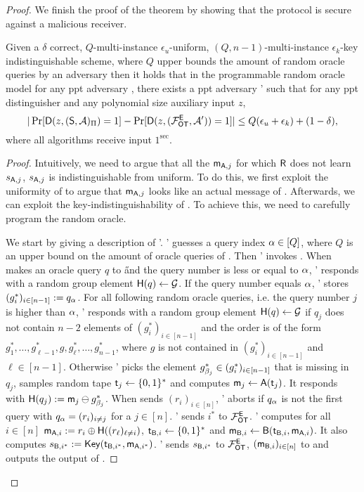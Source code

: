 \begin{proof}
We finish the proof of the theorem by showing that the \OT protocol is secure against a malicious receiver.
\begin{claim}\label{claim:malreceiver}
Given a $\delta$ correct,  $Q$-multi-instance $\epsilon_u$-uniform,  $(Q,n-1)$-multi-instance $\epsilon_k$-key indistinguishable  \UKA scheme, where $Q$ upper bounds the amount of random oracle queries by an adversary then it holds that in the programmable random oracle model for any ppt adversary \Adv, there exists a ppt adversary \Adv' such that for any ppt distinguisher \D and any polynomial size auxiliary input $z$,
$$
|\Pr[\mathsf D(z,(\mathsf{S}, \mathcal{A})_{\Pi})=1] -\Pr[\mathsf D(z,(\mathcal{F}_{\mathsf{OT}}^\mathsf{E},\mathcal{A}'))=1]|\leq Q(\epsilon_{u}+\epsilon_{k})+(1-\delta),
$$
where all algorithms receive input $1^\sec$.
\end{claim}


\begin{proof}
Intuitively, we need to argue that all the $\mathsf{m}_{\mathsf{A},j}$ for which $\mathsf{R}$ does not learn $s_{\mathsf{A},j}$,  $s_{\mathsf{A},j}$ is indistinguishable from uniform. To do this, we first exploit the uniformity of \UKA to argue that $\mathsf{m}_{\mathsf{A},j}$ looks like an actual message of \UKA. Afterwards, we can exploit the key-indistinguishability of \UKA. To achieve this, we need to carefully program the random oracle.

We start by giving a description of \Adv'. \Adv' guesses a query index $\alpha\in[Q]$, where $Q$ is an upper bound on the amount of oracle queries of \Adv. Then \Adv'  invokes \Adv.
When \Adv makes an oracle query $q$ to \H and the query number is less or equal to $\alpha$, \Adv' responds with a random group element $\mathsf{H}(q)\leftarrow\mathcal{G}$. 
If the query number equals $\alpha$, \Adv' stores $(g^*_i)_{i\in[n-1]}:=q_{\alpha}$. 
For all following random oracle queries, i.e. the query number $j$ is higher than $\alpha$, \Adv ' responds with a random group element $\mathsf{H}(q)\leftarrow\mathcal{G}$ if $q_j$ does not contain $n-2$ elements of $(g^*_i)_{i\in[n-1]}$  and the order is of the form $g^*_1,\dots, g^*_{\ell-1},g,g^*_{\ell},\dots, g^*_{n-1}$, where $g$ is not contained in $(g^*_i)_{i\in[n-1]}$ and $\ell\in[n-1]$. Otherwise \Adv' picks the element $g^*_{\beta_j}\in(g^*_i)_{i\in[n-1]}$ that is missing in $q_j$,  samples random tape $\mathsf{t}_j\leftarrow\{0,1\}^*$ and computes $\mathsf{m}_{j}\leftarrow\mathsf{A}(\mathsf{t}_j)$. 
It responds with $\mathsf{H}(q_j):=\mathsf{m}_j\ominus g^*_{\beta_j}$. When \Adv sends $(r_i)_{i\in[n]}$, \Adv' aborts if $q_{\alpha}$ is not the first query with $q_{\alpha}=(r_i)_{i\neq j}$ for a $j\in[n]$. \Adv' sends $i^*$ to $\mathcal{F}_{\mathsf{OT}}^\mathsf{E}$. \Adv' computes for all $i\in[n]$ $\mathsf{m}_{\mathsf{A},i}:=r_i\oplus\mathsf{H}((r_\ell)_{\ell\neq i})$, $\mathsf{t}_{\mathsf{B},i}\leftarrow\{0,1\}^*$ and $\mathsf{m}_{\mathsf{B},i}\leftarrow\mathsf{B}(\mathsf{t}_{\mathsf{B},i},\mathsf{m}_{\mathsf{A},i})$. It also computes $s_{\mathsf{B},i^*}:=\mathsf{Key}(\mathsf{t}_{\mathsf{B},i^*},\mathsf{m}_{\mathsf{A},i^*})$.
\Adv' sends $s_{\mathsf{B},i^*}$ to $\mathcal{F}_{\mathsf{OT}}^\mathsf{E}$, $(\mathsf{m}_{\mathsf{B},i})_{i\in[n]}$ to \Adv and outputs the output of \Adv.


\end{proof}
\end{proof}
